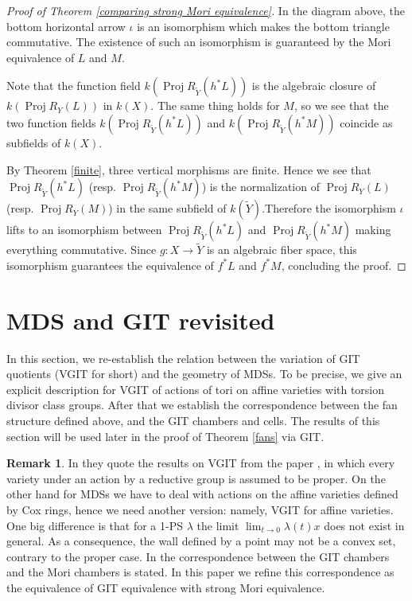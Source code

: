 \documentclass[12pt,twoside]{amsart}
\theoremstyle{definition}
\newtheorem{rem}[theo]{Remark}
\newcommand\Proj{\mathop{\mathrm{Proj}}}
\begin{document}
\begin{proof}[Proof of Theorem \ref{comparing strong Mori equivalence}]
In the diagram above, the bottom horizontal arrow $\iota$ is an isomorphism which makes the bottom
triangle commutative. The existence of such an isomorphism is guaranteed by the Mori equivalence
of $L$ and $M$.

Note that the function field
$k(\Proj{R_{\tilde{Y}}(h^{*}L)})$ is the algebraic closure of $k(\Proj{R_{Y}(L)})$ in $k(X)$.
The same thing holds for $M$,
so we see that the two function fields $k(\Proj{R_{\tilde{Y}}(h^{*}L)})$ and $k(\Proj{R_{\tilde{Y}}(h^{*}M)})$
coincide as subfields of $k(X)$. 

By Theorem \ref{finite}, three vertical morphisms are finite. Hence we see that
$\Proj{R_{\tilde{Y}}(h^{*}L)}$ (resp. $\Proj{R_{\tilde{Y}}(h^{*}M)}$) is the normalization of
$\Proj{R_{Y}(L)}$ (resp. $\Proj{R_{Y}(M)}$) in the same subfield of $k(\tilde{Y})$.Therefore the isomorphism $\iota$
lifts to an isomorphism between $\Proj{R_{\tilde{Y}}(h^{*}L)}$ and $\Proj{R_{\tilde{Y}}(h^{*}M)}$
making everything commutative. Since $g:X\to\tilde{Y}$ is an algebraic fiber space,
this isomorphism guarantees the equivalence of $f^*L$ and $f^*M$, concluding the proof.


\end{proof}








\section{MDS and GIT revisited}\label{MDS and GIT revisited}

In this section, we re-establish the relation between the variation of GIT quotients (VGIT for short)
and the geometry of MDSs. To be precise, we give an explicit description for VGIT of actions of
tori on affine varieties with torsion divisor class groups. After that
we establish the correspondence 
between the fan structure defined above, and the GIT chambers and cells. The results of this section
will be used later in the proof of Theorem \ref{fans} via GIT.

\begin{rem}
In \cite{hk} they quote the results on VGIT from the paper \cite{dh}, 
in which every variety under an action by a reductive group is assumed to be proper.
On the other hand for MDSs we have to deal with actions on the affine varieties defined
by Cox rings, hence we need another version: namely, VGIT for affine varieties.
One big difference is that for a 1-PS $\lambda$ the limit
$\lim_{t\to 0}\lambda (t)x$ does not exist in general. As a consequence, the wall defined by
a point may not be a convex set, contrary to the proper case.
In \cite{hk} the correspondence between the GIT chambers and the Mori chambers is stated.
In this paper we refine this correspondence as the equivalence of
GIT equivalence with strong Mori equivalence.
\end{rem}
\end{document}
